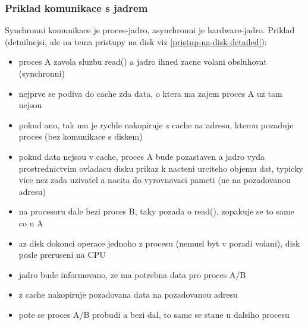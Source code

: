 \documentclass[a4paper, 11pt]{article}
\begin{document}
\subsubsection{Priklad komunikace s jadrem} \label{pristup-na-disk}
Synchronni komunikace je proces-jadro, asynchronni je hardware-jadro. Priklad (detailnejsi, ale na tema pristupy na disk viz \ref{pristup-na-disk-detailed}):
\begin{itemize}
    \item proces A zavola sluzbu read() a jadro ihned zacne volani obsluhovat (synchronni)
    \item nejprve se podiva do cache zda data, o ktera ma zajem proces A uz tam nejsou
    \item pokud ano, tak mu je rychle nakopiruje z cache na adresu, kterou pozaduje proces (bez komunikace s diskem)
    \item pokud data nejsou v cache, proces A bude pozastaven a jadro vyda prostrednictvim ovladacu disku prikaz k nacteni urciteho objemu dat, typicky vice nez zada uzivatel a nacita do vyrovnavaci pameti (ne na pozadovanou adresu)
    \item na procesoru dale bezi proces B, taky pozada o read(), zopakuje se to same co u A
    \item az disk dokonci operace jednoho z procesu (nemusi byt v poradi volani), disk posle preruseni na CPU
    \item jadro bude informovano, ze ma potrebna data pro proces A/B
    \item z cache nakopiruje pozadovana data na pozadovanou adresu
    \item pote se proces A/B probudi a bezi dal, to same se stane u dalsiho procesu \\
\end{itemize}
\end{document}
